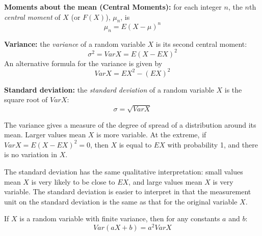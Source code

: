 \begin{definition}
	\textbf{Moments about the mean (Central Moments):} for each integer $n$, the $n$th \textit{central moment} of $X$ (or $F(X)$), $\mu_n$, is
	\[
		\mu_n = E(X - \mu)^n
	\]
\end{definition}

\begin{definition}
	\textbf{Variance:} the \textit{variance} of a random variable $X$ is its second central moment:
	\[
		\sigma^2 = VarX = E(X - EX)^2
	\]
	An alternative formula for the variance is given by
	\[
		VarX = EX^2 - (EX)^2
	\]
\end{definition}

\begin{definition}
	\textbf{Standard deviation:} the \textit{standard deviation} of a random variable $X$ is the square root of $Var X$:
	\[
		\sigma = \sqrt{VarX}
	\]
\end{definition}

The variance gives a measure of the degree of spread of a distribution around its mean. Larger values mean $X$ is more variable. At the extreme, if $VarX = E(X - EX)^2 = 0$, then $X$ is equal to $EX$ with probability 1, and there is no variation in $X$.

The standard deviation has the same qualitative interpretation: small values mean $X$ is very likely to be close to $EX$, and large values mean $X$ is very variable. The standard deviation is easier to interpret in that the measurement unit on the standard deviation is the same as that for the original variable $X$.

\begin{theorem}
	If $X$ is a random variable with finite variance, then for any constants $a$ and $b$:
	\[
		Var(aX + b) = a^2 VarX
	\]
\end{theorem}

\begin{definition}
	\textbf{}
\end{definition}